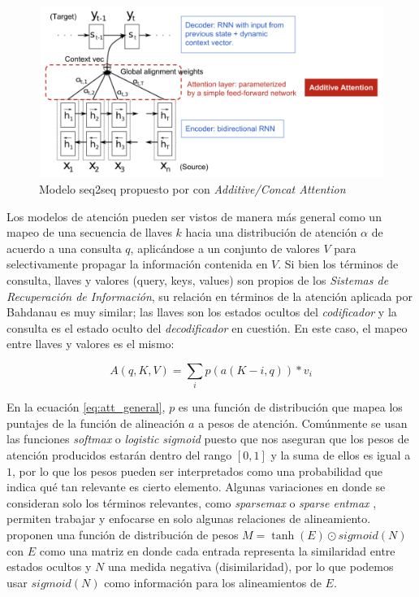 \begin{figure}[ht!]
    \centering
    \includegraphics[width=0.8 \textwidth]{Chapters/2. Transformer/Figures/rnn/attention.png}
    \caption{Modelo seq2seq propuesto por \citeauthor{bahdanau2016neural} con \textit{Additive/Concat Attention}}
    \label{fig:att}
\end{figure}

Los modelos de atención pueden ser vistos de manera más general como un mapeo de una secuencia de
llaves $k$ hacia una distribución de atención $\alpha$ de acuerdo a una consulta $q$, aplicándose a
un conjunto de valores $V$ para selectivamente propagar la información contenida en $V$. Si bien los
términos de consulta, llaves y valores (query, keys, values) son propios de los \textit{Sistemas de
Recuperación de Información}, su relación en términos de la atención aplicada por Bahdanau es muy
similar; las llaves son los estados ocultos del \textit{codificador} y la consulta es el estado
oculto del \textit{decodificador} en cuestión. En este caso, el mapeo entre llaves y valores es el mismo:


\begin{equation}
    A(q, K, V) = \sum_i p(a(K-i, q)) * v_i
    \label{eq:att_general}
\end{equation}

En la ecuación \ref{eq:att_general}, $p$ es una función de distribución que mapea los puntajes de la
función de alineación $a$ a pesos de atención. Comúnmente se usan las funciones \textit{softmax} o
\textit{logistic sigmoid} puesto que nos aseguran que los pesos de atención producidos estarán dentro
del rango $[0,1]$ y la suma de ellos es igual a $1$, por lo que los pesos pueden ser interpretados
como una probabilidad que indica qué tan relevante es cierto elemento. Algunas variaciones en donde
se consideran solo los términos relevantes, como \textit{sparsemax} \citeauthor{DBLP:journals/corr/MartinsA16}
o \textit{sparse entmax} \citeauthor{DBLP:journals/corr/abs-2006-07214}, permiten trabajar y enfocarse
en solo algunas relaciones de alineamiento. \citeauthor{NEURIPS2019_16fc18d7} proponen una función de
distribución de pesos $M = \tanh(E) \odot sigmoid(N)$ con $E$ como una matriz en donde cada entrada
representa la similaridad entre estados ocultos y $N$ una medida negativa (disimilaridad), por lo que
podemos usar $sigmoid(N)$ como información para  los alineamientos de $E$.


